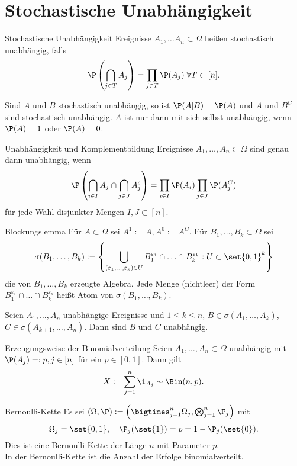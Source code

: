 \section*{Stochastische Unabhängigkeit}

\begin{karte}{Stochastische Unabhängigkeit}
    Ereignisse \( A_1, \ldots A_n \subset \Omega \) heißen stochastisch 
    unabhängig, falls 
    \[ \P\left( \bigcap_{j\in T} A_j \right) = \prod_{j \in T} \P(A_j) \; \forall T\subset [n]. \]

    Sind \( A \) und \( B \) stochastisch unabhängig, so ist \( \P(A|B) = \P(A) \) 
    und \( A \) und \( B^C \) sind stochastisch unabhängig.
    \( A \) ist nur dann mit sich selbst unabhängig, wenn \( \P(A) = 1 \) oder \( \P(A) = 0 \).
\end{karte}

\begin{karte}{Unabhängigkeit und Komplementbildung}
    Ereignisse \( A_1,\ldots, A_n \subset \Omega \) sind genau dann unabhängig, wenn 
    \[ \P\left( \bigcap_{i \in I} A_j \cap \bigcap_{j \in J} A_j^c \right) 
    = \prod_{i\in I} \P(A_i) \prod_{j\in J} \P(A_j^C) \] 
    für jede Wahl disjunkter Mengen \( I,J \subset [n] \).
\end{karte}

\begin{karte}{Blockungslemma}
    Für \( A \subset \Omega \) sei \( A^1 := A, A^0 := A^C \).
    Für \( B_1,\ldots, B_k \subset \Omega \) sei 
    \[ \sigma(B_1,\ldots,B_k) 
    := \left\{ \bigcup_{ (\varepsilon_1,\ldots,\varepsilon_k)\in U } 
    B_1^{\varepsilon_1} \cap \ldots \cap B_k^{\varepsilon_k} : U \subset \set{0,1}^k \right\} \]
    die von \( B_1,\ldots,B_k \) erzeugte Algebra.
    Jede Menge (nichtleer) der Form \\
    \( B_1^{\varepsilon_1} \cap \ldots \cap B_k^{\varepsilon_k} \)
    heißt Atom von \( \sigma(B_1,\ldots,B_k) \).

    Seien \( A_1, \ldots, A_n \) unabhängige Ereignisse und \(1\leq k \leq n\), 
    \( B \in \sigma(A_1,\ldots,A_k) \), \( C \in \sigma(A_{k+1}, \ldots, A_n) \). 
    Dann sind \(B\) und \(C\) unabhängig.
\end{karte}

\begin{karte}{Erzeugungsweise der Binomialverteilung}
    Seien \( A_1, \ldots, A_n \subset \Omega \) unabhängig mit 
    \( \P(A_j) =: p, j \in [n] \) für ein \( p \in [0,1] \). 
    Dann gilt 
    \[ X := \sum_{j=1}^n \1_{A_j} \sim \Bin(n,p). \]
\end{karte}

\begin{karte}{Bernoulli-Kette}
    Es sei \( (\Omega, \P) := \left( \bigtimes_{j=1}^n \Omega_j, 
    \bigotimes_{j=1}^n \P_j \right) \) mit 
    \[ \Omega_j = \set{0,1}, \quad \P_j(\set{1}) = p = 1 - \P_j(\set{0}). \]
    Dies ist eine Bernoulli-Kette der Länge \(n\) mit Parameter \(p\).\\
    In der Bernoulli-Kette ist die Anzahl der Erfolge binomialverteilt.
\end{karte}